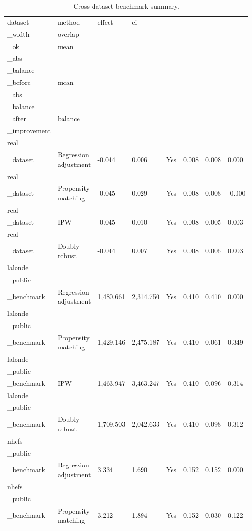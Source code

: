 \begin{table}[t!]
\centering
\small
\caption{Cross-dataset benchmark summary.}
\label{tab:cross-dataset-benchmarks}
\setlength{\tabcolsep}{4.5pt}
\begin{tabular}{llllllll}
\hline
dataset & method & effect & ci\\_width & overlap\\_ok & mean\\_abs\\_balance\\_before & mean\\_abs\\_balance\\_after & balance\\_improvement \\
\hline
real\\_dataset & Regression adjustment & -0.044 & 0.006 & Yes & 0.008 & 0.008 & 0.000 \\
real\\_dataset & Propensity matching & -0.045 & 0.029 & Yes & 0.008 & 0.008 & -0.000 \\
real\\_dataset & IPW & -0.045 & 0.010 & Yes & 0.008 & 0.005 & 0.003 \\
real\\_dataset & Doubly robust & -0.044 & 0.007 & Yes & 0.008 & 0.005 & 0.003 \\
lalonde\\_public\\_benchmark & Regression adjustment & 1,480.661 & 2,314.750 & Yes & 0.410 & 0.410 & 0.000 \\
lalonde\\_public\\_benchmark & Propensity matching & 1,429.146 & 2,475.187 & Yes & 0.410 & 0.061 & 0.349 \\
lalonde\\_public\\_benchmark & IPW & 1,463.947 & 3,463.247 & Yes & 0.410 & 0.096 & 0.314 \\
lalonde\\_public\\_benchmark & Doubly robust & 1,709.503 & 2,042.633 & Yes & 0.410 & 0.098 & 0.312 \\
nhefs\\_public\\_benchmark & Regression adjustment & 3.334 & 1.690 & Yes & 0.152 & 0.152 & 0.000 \\
nhefs\\_public\\_benchmark & Propensity matching & 3.212 & 1.894 & Yes & 0.152 & 0.030 & 0.122 \\

\end{tabular}
\end{table}
